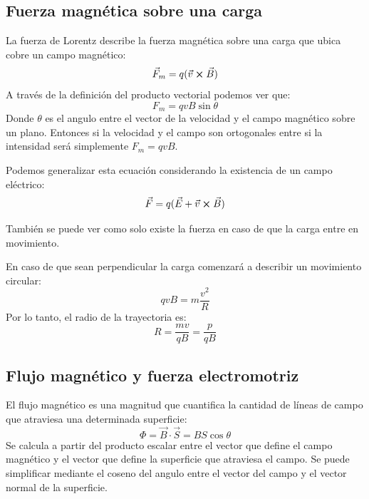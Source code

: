\documentclass[arial,a4paper,print]{article}
\begin{document}
\subsection{Fuerza magnética sobre una carga}
La fuerza de Lorentz describe la fuerza magnética sobre una carga que ubica cobre un campo magnético:
\begin{equation*}
	\vec{F}_{m} = q(\vec{v}\cross\vec{B})
\end{equation*}
A través de la definición del producto vectorial podemos ver que:
\begin{equation*}
	F_{m} = qvB\sin\theta 
\end{equation*}
Donde $\theta$ es el angulo entre el vector de la velocidad y el campo magnético sobre un plano.
Entonces si la velocidad y el campo son ortogonales entre si la intensidad será simplemente $F_{m}=qvB$. 

Podemos generalizar esta ecuación considerando la existencia de un campo eléctrico:
\begin{equation*}
	\vec{F} = q(\vec{E} + \vec{v}\cross\vec{B})
\end{equation*}

También se puede ver como solo existe la fuerza en caso de que la carga entre en movimiento.

En caso de que sean perpendicular la carga comenzará a describir un movimiento circular:
\begin{equation*}
	qvB=m\frac{v^{2}}{R}
\end{equation*}
Por lo tanto, el radio de la trayectoria es:
\begin{equation*}
	R=\frac{mv}{qB} = \frac{p}{qB}
\end{equation*}

\subsection{Flujo magnético y fuerza electromotriz}

El flujo magnético es una magnitud que cuantifica la cantidad de líneas de campo que atraviesa una determinada superficie:
\begin{equation*}
	\Phi = \vec{B}\cdot\vec{S} = BS\cos\theta
\end{equation*}
Se calcula a partir del producto escalar entre el vector que define el campo magnético y el vector que define la superficie que atraviesa el campo. Se puede simplificar mediante el coseno del angulo entre el vector del campo y el vector normal de la superficie. 
\end{document}
